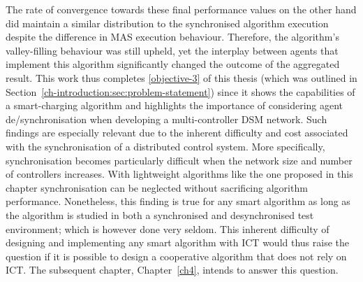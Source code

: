 The rate of convergence towards these final performance values on the other hand did maintain a similar distribution to the synchronised algorithm execution despite the difference in MAS execution behaviour.
Therefore, the algorithm's valley-filling behaviour was still upheld, yet the interplay between agents that implement this algorithm significantly changed the outcome of the aggregated result.
This work thus completes \ref{objective-3} of this thesis (which was outlined in Section~\ref{ch-introduction:sec:problem-statement}) since it shows the capabilities of a smart-charging algorithm and highlights the importance of considering agent de/synchronisation when developing a multi-controller DSM network.
Such findings are especially relevant due to the inherent difficulty and cost associated with the synchronisation of a distributed control system.
More specifically, synchronisation becomes particularly difficult when the network size and number of controllers increases.
With lightweight algorithms like the one proposed in this chapter synchronisation can be neglected without sacrificing algorithm performance.
Nonetheless, this finding is true for any smart algorithm as long as the algorithm is studied in both a synchronised and desynchronised test environment; which is however done very seldom.
This inherent difficulty of designing and implementing any smart algorithm with ICT would thus raise the question if it is possible to design a cooperative algorithm that does not rely on ICT.
The subsequent chapter, Chapter~\ref{ch4}, intends to answer this question.






